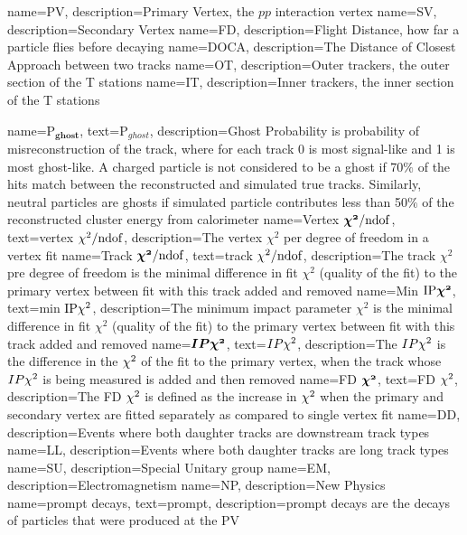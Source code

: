{
	name=PV,
		description={Primary Vertex, the $pp$ interaction vertex}
}
{
	name=SV,
		description={Secondary Vertex}
}
{
	name=FD,
		description={Flight Distance, how far a particle flies before decaying}
}                                                                      
{
	name=DOCA,
		description={The Distance of Closest Approach between two tracks} 
}
{
	name=OT,
		description={Outer trackers, the outer section of the T stations} 
}
{
	name=IT,
		description={Inner trackers, the inner section of the T stations} 
}

{
	name=P$\mathbold{_{ghost}}$,%
		text=P$_{ghost}$,
		description={Ghost Probability is probability of misreconstruction of the track, where for each track 0 is most signal-like and 1 is most ghost-like. A charged particle is not considered to be a ghost if 70$\%$ of the hits match between the reconstructed and simulated true tracks. Similarly, neutral particles are ghosts if simulated particle contributes less than 50$\%$ of the reconstructed cluster energy from calorimeter} 
}                
{
	        name={Vertex $\mathbold{\chisq/\rm{ndof}}$},
		text={vertex ${\chi^2/\rm{ndof}}$},
		description={The vertex $\chi^{2}$ per degree of freedom in a vertex fit} %
		}
{
	        name={Track $\mathbold{\chisq/\rm{ndof}}$},
		text={track $\chi^2/\rm{ndof}$},
		description={The track $\chi^{2}$ pre degree of freedom is the minimal difference in fit $\chi^{2}$ (quality of the fit) to the primary vertex between fit with this track added  and removed} %
		}
{
	        name={Min $\mathbold{\mathrm{IP}\chisq}$},
		text={min $\mathrm{IP}\chi^2$},
		description={The minimum impact parameter $\chi^{2}$ is the minimal difference in fit $\chi^{2}$ (quality of the fit) to the primary vertex between fit with this track added  and removed} %
		}
{
	name=$\mathbold{IP\chisq}$,
		text=$IP\chi^2$,
		description={The $IP\chi^2$ is the difference in the $\chi^2$ of the fit to the primary vertex, when the track whose $IP\chi^2$ is being measured is added and then removed}
} 
{
	        name=FD $\mathbold{\chisq}$,
		text=FD $\chi^2$,
		description={The \Gls{FD} $\chi^2$ is defined as the increase in $\chi^2$ when the primary and secondary vertex are fitted separately as compared to single vertex fit}
}                
{
	name=DD,
		description={Events where both daughter tracks are downstream track types}
}
{
	name=LL,
		description={Events where both daughter tracks are long track types}
}
{
	name=SU,
		description={Special Unitary group}
}                 
{
	name=EM,
		description={Electromagnetism}
}                 
{
	name=NP,
		description={New Physics}
}
{
	name=prompt decays,
		text=prompt,
		description={prompt decays are the decays of particles that were produced at the \Gls{PV}}
}

